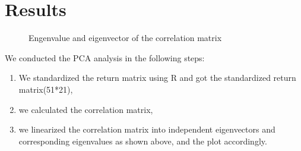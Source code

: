 \documentclass[oneside,12pt]{report}
\begin{document}
\chapter{Results}\label{Results}
\begin{figure}[ht]
\centering
{}
\caption[Optional caption for list of figures]{Engenvalue and eigenvector of the correlation matrix}
\label{fig:subfigureExample}
\end{figure}
We conducted the PCA analysis in the following steps:
\begin{enumerate}
\item We standardized the return matrix using R and got the standardized return matrix(51*21),
\item we calculated the correlation matrix,
\item we linearized the correlation matrix into independent eigenvectors and corresponding eigenvalues as shown above, and the plot accordingly.
\end{enumerate}
\end{document}
